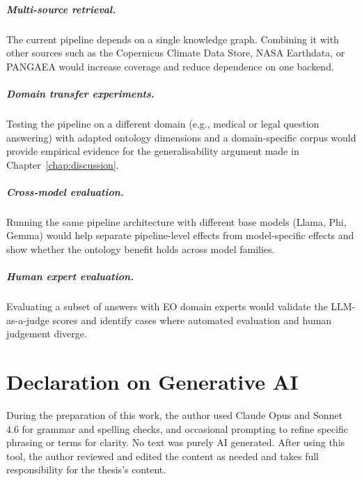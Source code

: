 \paragraph{Multi-source retrieval.} The current pipeline depends on a single knowledge graph. Combining it with other sources such as the Copernicus Climate Data Store, NASA Earthdata, or PANGAEA would increase coverage and reduce dependence on one backend.

\paragraph{Domain transfer experiments.} Testing the pipeline on a different domain (e.g., medical or legal question answering) with adapted ontology dimensions and a domain-specific corpus would provide empirical evidence for the generalisability argument made in Chapter~\ref{chap:discussion}.

\paragraph{Cross-model evaluation.} Running the same pipeline architecture with different base models (Llama, Phi, Gemma) would help separate pipeline-level effects from model-specific effects and show whether the ontology benefit holds across model families.

\paragraph{Human expert evaluation.} Evaluating a subset of answers with EO domain experts would validate the LLM-as-a-judge scores and identify cases where automated evaluation and human judgement diverge.

\chapter*{Declaration on Generative AI}

During the preparation of this work, the author used Claude Opus and Sonnet 4.6 for grammar and spelling checks, and occasional prompting to refine specific phrasing or terms for clarity. No text was purely AI generated. After using this tool, the author reviewed and edited the content as needed and takes full responsibility for the thesis's content.
